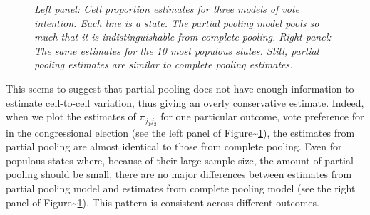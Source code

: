 \documentclass[11pt,article,oneside]{memoir}
\begin{document}
\begin{figure}
  \centering
  \caption{\em Left panel: Cell proportion estimates for three models of vote
    intention. Each line is a state. The
    partial pooling model pools so much that it is indistinguishable from
    complete pooling. Right panel: The same estimates for the 10 most populous
    states. Still, partial pooling estimates are similar to complete pooling
    estimates.}
  \label{fig:234}
\end{figure}

This seems to suggest that partial pooling does not have enough
information to estimate cell-to-cell variation, thus giving an overly
conservative estimate. Indeed, when we plot the estimates of
\(\pi_{j_1j_2}\) for one particular outcome, vote preference for in the
congressional election (see the left panel of
Figure\textasciitilde{}\ref{fig:234}), the estimates from partial
pooling are almost identical to those from complete pooling. Even for
populous states where, because of their large sample size, the amount of
partial pooling should be small, there are no major differences between
estimates from partial pooling model and estimates from complete pooling
model (see the right panel of Figure\textasciitilde{}\ref{fig:234}).
This pattern is consistent across different outcomes.
\end{document}
